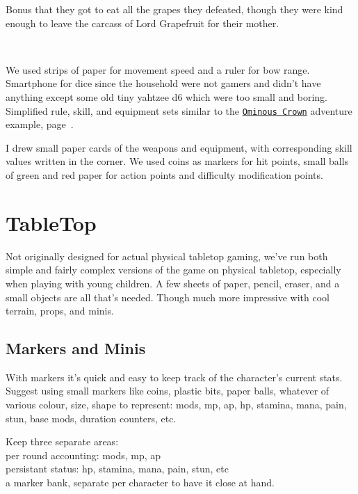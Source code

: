 Bonus that they got to eat all the grapes they defeated, though they were kind enough to leave the carcass of Lord Grapefruit for their mother.

\

We used strips of paper for movement speed and a ruler for bow range. Smartphone for dice since the household were not gamers and didn't have anything except some old tiny yahtzee d6 which were too small and boring.
Simplified rule, skill, and equipment sets similar to the \hyperref[sec:basicenough]{\texttt{Ominous Crown}} adventure example, page~\pageref{sec:basicenough}.

I drew small paper cards of the weapons and equipment, with corresponding skill values written in the corner. We used coins as markers for hit points, small balls of green and red paper for action points and difficulty modification points.









\section*{TableTop}
Not originally designed for actual physical tabletop gaming, we've run both simple and fairly complex versions of the game on physical tabletop, especially when playing with young children.
A few sheets of paper, pencil, eraser, and a small objects are all that's needed. Though much more impressive with cool terrain, props, and minis.


\subsection*{Markers and Minis}
With markers it's quick and easy to keep track of the character's current stats. Suggest using small markers like coins, plastic bits, paper balls, whatever of various colour, size, shape to represent: mods, mp, ap, hp, stamina, mana, pain, stun, base mods, duration counters, etc.

Keep three separate areas:\\
per round accounting: mods, mp, ap\\
persistant status: hp, stamina, mana, pain, stun, etc\\
a marker bank, separate per character to have it close at hand.


